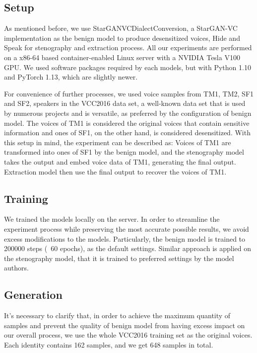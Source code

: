 \documentclass[journal]{IEEEtran} %
\begin{document}
\begin{CJK*}{UTF8}{gbsn}
\subsection{Setup}

As mentioned before, we use StarGANVCDialectConversion, a StarGAN-VC implementation as the benign model to produce desensitized voices, Hide and Speak for stenography and extraction process. All our experiments are performed on a x86-64 based container-enabled Linux server with a NVIDIA Tesla V100 GPU. We used software packages required by each models, but with Python 1.10 and PyTorch 1.13, which are slightly newer.

 For convenience of further processes, we used voice samples from TM1, TM2, SF1 and SF2, speakers in the VCC2016 data set\cite{a16}, a well-known data set that is used by numerous projects and is versatile\cite{a17, a18}, as preferred by the configuration of benign model. The voices of TM1 is considered the original voices that contain sensitive information and ones of SF1, on the other hand, is considered desensitized. With this setup in mind, the experiment can be described as: Voices of TM1 are transformed into ones of SF1 by the benign model, and the stenography model takes the output and embed voice data of TM1, generating the final output. Extraction model then use the final output to recover the voices of TM1.

\subsection{Training}

We trained the models locally on the server. In order to streamline the experiment process while preserving the most accurate possible results, we avoid excess modifications to the models. Particularly, the benign model is trained to 200000 steps (~60 epochs), as the default settings. Similar approach is applied on the stenography model, that it is trained to preferred settings by the model authors.

\subsection{Generation}

It's necessary to clarify that, in order to achieve the maximum quantity of samples and prevent the quality of benign model from having excess impact on our overall process, we use the whole VCC2016 training set as the original voices. Each identity contains 162 samples, and we get 648 samples in total.


\end{CJK*}
\end{document}
